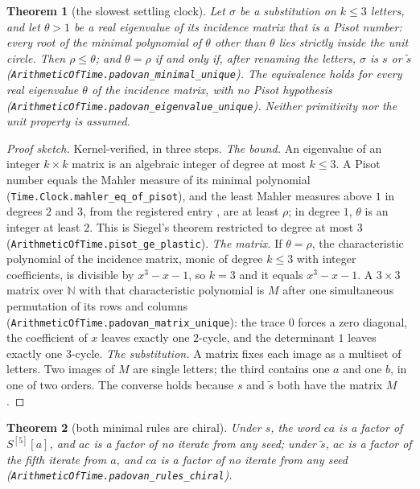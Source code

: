 \documentclass[11pt]{amsart}
\theoremstyle{plain}
\newtheorem{theorem}{Theorem}[section]
\theoremstyle{definition}
\theoremstyle{remark}
\begin{document}
\begin{theorem}[the slowest settling clock]\label{thm:unique}
Let $\sigma$ be a substitution on $k \le 3$ letters, and let $\theta > 1$ be a real eigenvalue
of its incidence matrix that is a Pisot number: every root of the minimal polynomial of
$\theta$ other than $\theta$ lies strictly inside the unit circle. Then $\rho \le \theta$; and
$\theta = \rho$ if and only if, after renaming the letters, $\sigma$ is $s$ or $\tilde s$
\textup{(\texttt{ArithmeticOfTime.padovan\_minimal\_unique})}. The equivalence holds for every
real eigenvalue $\theta$ of the incidence matrix, with no Pisot hypothesis
\textup{(\texttt{ArithmeticOfTime.padovan\_eigenvalue\_unique})}. Neither primitivity nor the
unit property is assumed.
\end{theorem}

\begin{proof}[Proof sketch]
Kernel-verified, in three steps.
\emph{The bound.} An eigenvalue of an integer $k \times k$ matrix is an algebraic integer of
degree at most $k \le 3$. A Pisot number equals the Mahler measure of its minimal polynomial
(\texttt{Time.Clock.mahler\_eq\_of\_pisot}), and the least Mahler measures above $1$ in
degrees $2$ and $3$, from the registered entry \cite{palomar-mahler}, are at least $\rho$; in
degree $1$, $\theta$ is an integer at least $2$. This is Siegel's theorem restricted to degree
at most $3$ (\texttt{ArithmeticOfTime.pisot\_ge\_plastic}).
\emph{The matrix.} If $\theta = \rho$, the characteristic polynomial of the incidence matrix,
monic of degree $k \le 3$ with integer coefficients, is divisible by $x^3 - x - 1$, so $k = 3$
and it equals $x^3 - x - 1$. A $3 \times 3$ matrix over $\mathbb{N}$ with that characteristic
polynomial is $M$ after one simultaneous permutation of its rows and columns
(\texttt{ArithmeticOfTime.padovan\_matrix\_unique}): the trace $0$ forces a zero diagonal, the
coefficient of $x$ leaves exactly one $2$-cycle, and the determinant $1$ leaves exactly one
$3$-cycle.
\emph{The substitution.} A matrix fixes each image as a multiset of letters. Two images of
$M$ are single letters; the third contains one $a$ and one $b$, in one of two orders. The
converse holds because $s$ and $\tilde s$ both have the matrix $M$.
\end{proof}

\begin{theorem}[both minimal rules are chiral]\label{thm:ruleschiral}
Under $s$, the word $ca$ is a factor of $S^{[5]}[a]$, and $ac$ is a factor of no iterate from any
seed; under $\tilde s$, $ac$ is a factor of the fifth iterate from $a$, and $ca$ is a factor of no
iterate from any seed \textup{(\texttt{ArithmeticOfTime.padovan\_rules\_chiral})}.
\end{theorem}
\end{document}
